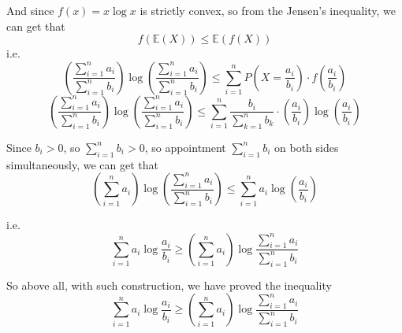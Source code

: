 \documentclass[10pt]{article}
\begin{document}
\begin{enumerate}[1.]
		  And since $f(x)=x\log x$ is strictly convex, so from the Jensen's inequality, we can get that\\
		  $$f(\mathbb{E}(X)) \leq \mathbb{E}(f(X))$$
		  i.e.
		  $$\left(\dfrac{\sum\limits_{i=1}^{n}a_i}{\sum\limits_{i=1}^{n}b_i}\right)\log \left(\dfrac{\sum\limits_{i=1}^{n}a_i}{\sum\limits_{i=1}^{n}b_i}\right) 
		  \leq \sum\limits_{i=1}^{n} P(X=\dfrac{a_i}{b_i})\cdot f(\dfrac{a_i}{b_i})$$
		  $$\left(\dfrac{\sum\limits_{i=1}^{n}a_i}{\sum\limits_{i=1}^{n}b_i}\right)\log \left(\dfrac{\sum\limits_{i=1}^{n}a_i}{\sum\limits_{i=1}^{n}b_i}\right)
		  \leq \sum\limits_{i=1}^{n} \dfrac{b_i}{\sum\limits_{k=1}^nb_k}\cdot(\dfrac{a_i}{b_i})\log(\dfrac{a_i}{b_i})$$
		  
		  Since $b_i>0$, so $\sum\limits_{i=1}^nb_i>0$, so appointment $\sum\limits_{i=1}^nb_i$ on both sides simultaneously, we can get that
		  $$\left(\sum\limits_{i=1}^{n} a_i\right) \log \left(\dfrac{\sum\limits_{i=1}^{n} a_i}{\sum\limits_{i=1}^{n} b_i}\right)
		  \leq \sum\limits_{i=1}^{n} a_i\log \left(\dfrac{a_i}{b_i}\right)$$
		  
		  i.e. $$\sum\limits_{i=1}^{n} a_i \log \frac{a_i}{b_i} \geq \left( \sum_{i=1}^{n} a_i\right) \log \frac{\sum_{i=1}^{n} a_i}{\sum_{i=1}^{n} b_i}$$

		  So above all, with such construction, we have proved the inequality
		  $$\sum_{i=1}^{n} a_i \log \frac{a_i}{b_i} \geq \left( \sum_{i=1}^{n} a_i\right) \log \frac{\sum_{i=1}^{n} a_i}{\sum_{i=1}^{n} b_i}$$

	      \newpage


\end{enumerate}
\end{document}
